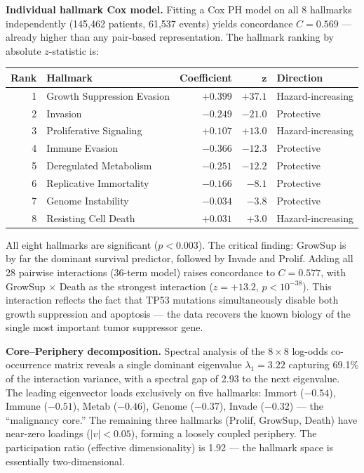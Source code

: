 \documentclass[
  11pt,
]{article}
\begin{document}
\textbf{Individual hallmark Cox model.} Fitting a Cox PH model on all 8
hallmarks independently (145,462 patients, 61,537 events) yields
concordance \(C = 0.569\) --- already higher than any pair-based
representation. The hallmark ranking by absolute \(z\)-statistic is:

\begin{center}
\begin{tabular}{r l r r l}
\hline
\textbf{Rank} & \textbf{Hallmark} & \textbf{Coefficient} & $\boldsymbol{z}$ & \textbf{Direction} \\
\hline
1 & Growth Suppression Evasion & $+0.399$ & $+37.1$ & Hazard-increasing \\
2 & Invasion & $-0.249$ & $-21.0$ & Protective \\
3 & Proliferative Signaling & $+0.107$ & $+13.0$ & Hazard-increasing \\
4 & Immune Evasion & $-0.366$ & $-12.3$ & Protective \\
5 & Deregulated Metabolism & $-0.251$ & $-12.2$ & Protective \\
6 & Replicative Immortality & $-0.166$ & $-8.1$ & Protective \\
7 & Genome Instability & $-0.034$ & $-3.8$ & Protective \\
8 & Resisting Cell Death & $+0.031$ & $+3.0$ & Hazard-increasing \\
\hline
\end{tabular}
\end{center}

All eight hallmarks are significant (\(p < 0.003\)). The critical
finding: GrowSup is by far the dominant survival predictor, followed by
Invade and Prolif. Adding all 28 pairwise interactions (36-term model)
raises concordance to \(C = 0.577\), with GrowSup \(\times\) Death as
the strongest interaction (\(z = +13.2\), \(p < 10^{-38}\)). This
interaction reflects the fact that TP53 mutations simultaneously disable
both growth suppression and apoptosis --- the data recovers the known
biology of the single most important tumor suppressor gene.

\textbf{Core--Periphery decomposition.} Spectral analysis of the
\(8 \times 8\) log-odds co-occurrence matrix reveals a single dominant
eigenvalue \(\lambda_1 = 3.22\) capturing 69.1\% of the interaction
variance, with a spectral gap of 2.93 to the next eigenvalue. The
leading eigenvector loads exclusively on five hallmarks: Immort
(\(-0.54\)), Immune (\(-0.51\)), Metab (\(-0.46\)), Genome (\(-0.37\)),
Invade (\(-0.32\)) --- the ``malignancy core.'' The remaining three
hallmarks (Prolif, GrowSup, Death) have near-zero loadings
(\(|v| < 0.05\)), forming a loosely coupled periphery. The participation
ratio (effective dimensionality) is 1.92 --- the hallmark space is
essentially two-dimensional.
\end{document}
